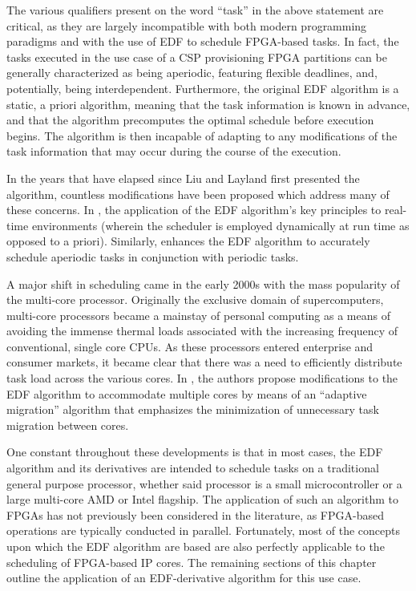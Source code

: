 The various qualifiers present on the word ``task'' in the above statement are critical, as they are largely incompatible with both modern programming paradigms and with the use of EDF to schedule FPGA-based tasks. In fact, the tasks executed in the use case of a CSP provisioning FPGA partitions can be generally characterized as being aperiodic, featuring flexible deadlines, and, potentially, being interdependent. Furthermore, the original EDF algorithm is a static, a priori algorithm, meaning that the task information is known in advance, and that the algorithm precomputes the optimal schedule before execution begins. The algorithm is then incapable of adapting to any modifications of the task information that may occur during the course of the execution.

In the years that have elapsed since Liu and Layland first presented the algorithm, countless modifications have been proposed which address many of these concerns. In \cite{stankovic_deadline_1998}, the application of the EDF algorithm's key principles to real-time environments (wherein the scheduler is employed dynamically at run time as opposed to a priori). Similarly, \cite{spuri_efficient_1994} enhances the EDF algorithm to accurately schedule aperiodic tasks in conjunction with periodic tasks.

A major shift in scheduling came in the early 2000s with the mass popularity of the multi-core processor. Originally the exclusive domain of supercomputers, multi-core processors became a mainstay of personal computing as a means of avoiding the immense thermal loads associated with the increasing frequency of conventional, single core CPUs. As these processors entered enterprise and consumer markets, it became clear that there was a need to efficiently distribute task load across the various cores. In \cite{abeni_edf_2020}, the authors propose modifications to the EDF algorithm to accommodate multiple cores by means of an ``adaptive migration'' algorithm that emphasizes the minimization of unnecessary task migration between cores.

One constant throughout these developments is that in most cases, the EDF algorithm and its derivatives are intended to schedule tasks on a traditional general purpose processor, whether said processor is a small microcontroller or a large multi-core AMD or Intel flagship. The application of such an algorithm to FPGAs has not previously been considered in the literature, as FPGA-based operations are typically conducted in parallel. Fortunately, most of the concepts upon which the EDF algorithm are based are also perfectly applicable to the scheduling of FPGA-based IP cores. The remaining sections of this chapter outline the application of an EDF-derivative algorithm for this use case.

